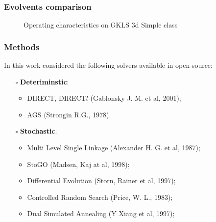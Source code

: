 \documentclass[aspectratio=1610]{beamer}
\begin{document}
\begin{frame}
  \frametitle{Evolvents comparison}
  \begin{figure}[ht]
    \hspace*{-0.9cm}
    \caption{Operating characteristics on GKLS 3d Simple class}
  \end{figure}
\end{frame}


\begin{frame}
  \frametitle{Methods}
  In this work considered the following solvers available in open-source:
  \begin{itemize}
    \item[$\square$] \textbf{Deteriminstic}:
    \begin{itemize}
      \item DIRECT, DIRECT$l$ (Gablonsky J. M. et al, 2001);
      \item AGS (Strongin R.G., 1978).
    \end{itemize}
    \item[$\square$] \textbf{Stochastic}:
    \begin{itemize}
      \item Multi Level Single Linkage (Alexander H. G. et al, 1987);
      \item StoGO (Madsen, Kaj at al, 1998);
      \item Differential Evolution (Storn, Rainer et al, 1997);
      \item Controlled Random Search (Price, W. L., 1983);
      \item Dual Simulated Annealing (Y Xiang et al, 1997);
    \end{itemize}
  \end{itemize}
\end{frame}
\end{document}
